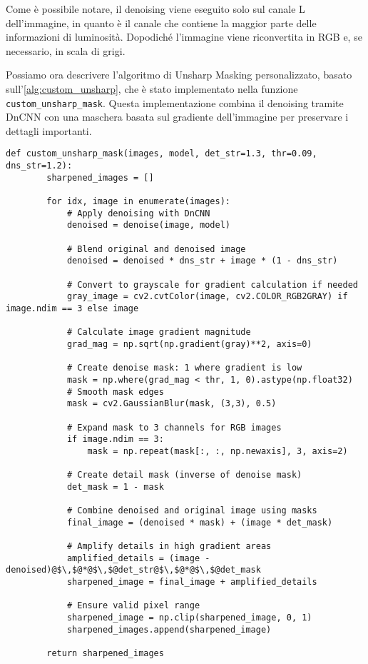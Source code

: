 Come è possibile notare, il denoising viene eseguito solo sul canale L dell'immagine, in quanto è il canale che contiene la maggior parte delle informazioni di luminosità. Dopodiché l'immagine viene riconvertita in RGB e, se necessario, in scala di grigi.

Possiamo ora descrivere l'algoritmo di Unsharp Masking personalizzato, basato sull'\cref{alg:custom_unsharp}, che è stato implementato nella funzione \texttt{custom\_unsharp\_mask}. Questa implementazione combina il denoising tramite DnCNN con una maschera basata sul gradiente dell'immagine per preservare i dettagli importanti.

\begin{lstlisting}[label={lst:unsharp_mask}]
    def custom_unsharp_mask(images, model, det_str=1.3, thr=0.09, dns_str=1.2):
        sharpened_images = []

        for idx, image in enumerate(images):
            # Apply denoising with DnCNN
            denoised = denoise(image, model)
            
            # Blend original and denoised image
            denoised = denoised * dns_str + image * (1 - dns_str)

            # Convert to grayscale for gradient calculation if needed
            gray_image = cv2.cvtColor(image, cv2.COLOR_RGB2GRAY) if image.ndim == 3 else image
            
            # Calculate image gradient magnitude
            grad_mag = np.sqrt(np.gradient(gray)**2, axis=0)

            # Create denoise mask: 1 where gradient is low
            mask = np.where(grad_mag < thr, 1, 0).astype(np.float32)
            # Smooth mask edges
            mask = cv2.GaussianBlur(mask, (3,3), 0.5)

            # Expand mask to 3 channels for RGB images
            if image.ndim == 3:
                mask = np.repeat(mask[:, :, np.newaxis], 3, axis=2)

            # Create detail mask (inverse of denoise mask)
            det_mask = 1 - mask

            # Combine denoised and original image using masks
            final_image = (denoised * mask) + (image * det_mask)

            # Amplify details in high gradient areas
            amplified_details = (image - denoised)@$\,$@*@$\,$@det_str@$\,$@*@$\,$@det_mask
            sharpened_image = final_image + amplified_details

            # Ensure valid pixel range
            sharpened_image = np.clip(sharpened_image, 0, 1)
            sharpened_images.append(sharpened_image)

        return sharpened_images
\end{lstlisting}

